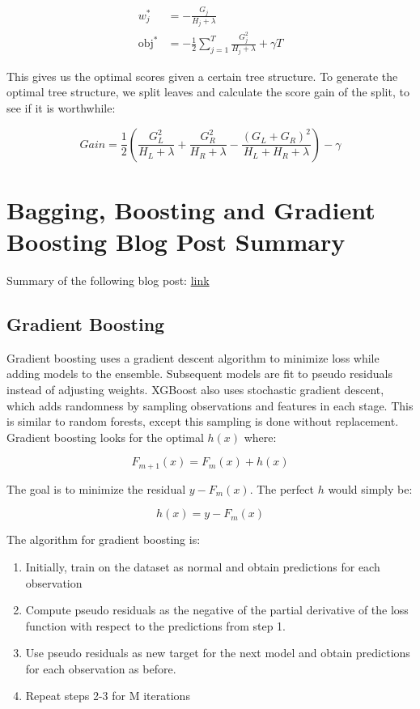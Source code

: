 \documentclass[12 pt, leqno]{article}
\begin{document}
\begin{align*}
w_j^* &= - \frac{G_j}{H_j + \lambda} \\ 
\text{obj}^* &= -\frac{1}{2} \sum_{j = 1}^T \frac{G_j^2}{H_j + \lambda} + \gamma T
\end{align*}

This gives us the optimal scores given a certain tree structure. To generate the optimal tree structure, we split leaves and calculate the score gain of the split, to see if it is worthwhile:

$$Gain = \frac{1}{2} \left( \frac{G_L^2}{H_L + \lambda} + \frac{G_R^2}{H_R + \lambda} - \frac{(G_L + G_R)^2}{H_L + H_R + \lambda} \right) - \gamma $$

\section{Bagging, Boosting and Gradient Boosting Blog Post Summary}

Summary of the following blog post: \href{https://towardsdatascience.com/bagging-boosting-and-gradient-boosting-1a8f135a5f4e}{link}

\subsection{Gradient Boosting}

Gradient boosting uses a gradient descent algorithm to minimize loss while adding models to the ensemble. Subsequent models are fit to pseudo residuals instead of adjusting weights. XGBoost also uses stochastic gradient descent, which adds randomness by sampling observations and features in each stage. This is similar to random forests, except this sampling is done without replacement. Gradient boosting looks for the optimal $h(x)$ where:

$$F_{m+1} (x) = F_m(x) + h(x) $$

The goal is to minimize the residual $y - F_m(x)$. The perfect $h$ would simply be:

$$h(x) = y - F_m(x)$$

The algorithm for gradient boosting is:

\begin{enumerate}
\item Initially, train on the dataset as normal and obtain predictions for each observation
\item Compute pseudo residuals as the negative of the partial derivative of the loss function with respect to the predictions from step 1.
\item Use pseudo residuals as new target for the next model and obtain predictions for each observation as before.
\item Repeat steps 2-3 for M iterations
\end{enumerate}
\end{document}
